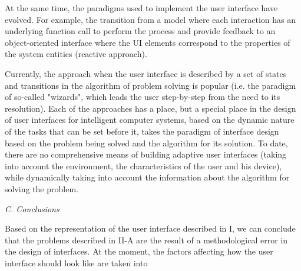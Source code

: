 \documentclass[10pt]{article}
\begin{document}
At the same time, the paradigms used to implement the
user interface have evolved. For example, the transition
from a model where each interaction has an underlying
function call to perform the process and provide feedback
to an object-oriented interface where the UI elements correspond
to the properties of the system entities (reactive
approach).

Currently, the approach when the user interface is
described by a set of states and transitions in the algorithm
of problem solving is popular (i.e. the paradigm
of so-called "wizards", which leads the user step-by-step
from the need to its resolution). Each of the approaches
has a place, but a special place in the design of user
interfaces for intelligent computer systems, based on the
dynamic nature of the tasks that can be set before it, takes
the paradigm of interface design based on the problem
being solved and the algorithm for its solution. To date,
there are no comprehensive means of building adaptive
user interfaces (taking into account the environment,
the characteristics of the user and his device), while
dynamically taking into account the information about
the algorithm for solving the problem.

\vspace{4mm}\textit{C. Conclusions}

\vspace{4mm}Based on the representation of the user interface described
in I, we can conclude that the problems described
in II-A are the result of a methodological error in the
design of interfaces. At the moment, the factors affecting
how the user interface should look like are taken into
\end{document}
